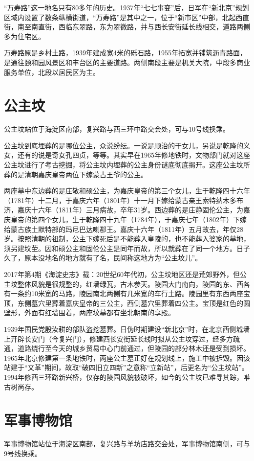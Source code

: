 “万寿路”这一地名只有80多年的历史。1937年“七七事变”后，日军在“新北京”规划区域内设置了数条纵横街道，“万寿路”是其中之一，位于“新市区”中部，北起西直街，南至南直街，西临东翠路，东为翠微路，并与西长安街延长线相交，道路两侧多为住宅区。

万寿路原是乡村土路，1939年建成宽4米的砾石路，1955年拓宽并铺筑沥青路面，是通往颐和园风景区和丰台区的主要道路。两侧南段主要是机关大院，中段多商业服务单位，北段以居民区为主。

\section{公主坟}
公主坟站位于海淀区南部，复兴路与西三环中路交会处，可与10号线换乘。

公主坟到底埋葬的是哪位公主，众说纷纭。一说是顺治的干女儿，另说是乾隆的义女，还有的说是奇女孔四贞，等等。其实早在1965年修地铁时，文物部门就对这座公主坟进行了考古挖掘，将公主坟内埋葬的公主身份谜底彻底揭开。这座公主坟所葬的是清朝嘉庆皇帝两位下嫁蒙古王爷的公主。

两座墓中东边葬的是庄敬和硕公主，为嘉庆皇帝的第三个女儿，生于乾隆四十六年（1781年）十二月，于嘉庆六年（1801年）十一月下嫁给蒙古亲王索特纳木多布济，嘉庆十六年（1811年）三月病故，卒年31岁。西边葬的是庄静固伦公主，为嘉庆皇帝的第四个女儿，生于乾隆四十九年（1784年），于嘉庆七年（1802年）下嫁给蒙古族土默特部的玛尼巴达喇郡王。嘉庆十六年（1811年）五月故去，年仅28岁。按照清朝的祖制，公主下嫁死后是不能葬入皇陵的，也不能葬入婆家的墓地，须另建坟茔。因和硕公主和固伦公主是同年而故，所以就葬在了同一个地方。日子久了，原本没地名的地方就有了名，民间称这地方为“公主坟儿”。

2017年第4期《海淀史志》载：20世纪60年代初，公主坟地区还是荒郊野外，但公主坟整体风貌是很规整的，红墙绿瓦，古木参天。陵园大门南向，陵园的东、西各有一条约10米宽的马路，陵园南北两侧有几米宽的车行土路。陵园里有东西两座宝顶，东侧墓穴里葬着嘉庆皇帝的三公主，西侧墓穴里葬着四公主。宝顶是红色的圆壁形，外面有红墙围着，两座坟墓都有坐北朝南的享殿。

1939年国民党殷汝耕的部队盗挖墓葬。日伪时期建设“新北京”时，在北京西侧城墙上开辟长安门（今复兴门），修建西长安街延长线时拟从公主坟穿过，经多方疏通，道路绕行至今天的城乡贸易中心门前通过，但陵园的部分林木还是受到损坏。1965年北京修建第一条地铁时，两座公主墓正好在规划线上，施工中被拆毁。因该站建于“文革”期间，故取“破四旧立四新”之意称“立新站”，后更名为“公主坟站”。1994年修西三环路新兴桥，仅存的陵园风貌被破坏，如今的公主坟已难寻其踪，唯古树尚存。

\section{军事博物馆}
军事博物馆站位于海淀区南部，复兴路与羊坊店路交会处，军事博物馆南侧，可与9号线换乘。

